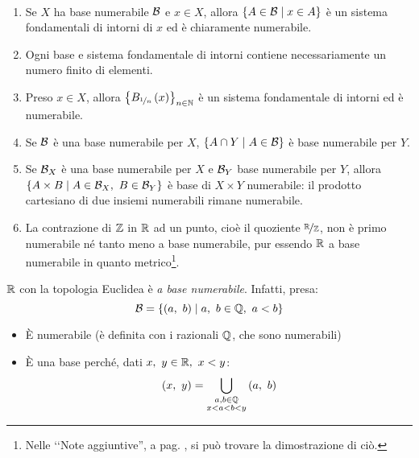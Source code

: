 \begin{demonstration}~{}
\begin{enumerate}[label=\Roman*]
	\item Se $X$ ha base numerabile $\mathcal{B}$ e $x\in X$, allora $\left\{A\in \mathcal{B}\mid x\in A\right\}$ è un sistema fondamentali di intorni di $x$ ed è chiaramente numerabile.
	\item Ogni base e sistema fondamentale di intorni contiene necessariamente un numero finito di elementi.
	\item Preso $x\in X$, allora $\left\{B_{\nicefrac{1}{n}}\left(x\right)\right\}_{n\in\mathbb{N}}$ è un sistema fondamentale di intorni ed è numerabile.
	\item Se $\mathcal{B}$ è una base numerabile per $X$, $\left\{A\cap Y\mid A\in \mathcal{B}\right\}$ è base numerabile per $Y$.
	\item Se $\mathcal{B}_X$ è una base numerabile per $X$ e $\mathcal{B}_Y$ base numerabile per $Y$, allora $\left\{A\times B\mid A\in \basis_X,\ B\in\basis_Y\right\}$ è base di $X\times Y$ numerabile: il prodotto cartesiano di due insiemi numerabili rimane numerabile.
	\item La contrazione di $\mathbb{Z}$ in $\mathbb{R}$ ad un punto, cioè il quoziente $\nicefrac{\mathbb{R}}{\mathbb{Z}}$, non è primo numerabile né tanto meno a base numerabile, pur essendo $\mathbb{R}$ a base numerabile in quanto metrico\footnote{Nelle ‘‘Note aggiuntive'', a pag. \pageref{dimostrazionenonnumerabilità}, si può trovare la dimostrazione di ciò.}.
\end{enumerate}
\vspace{-3mm}
\end{demonstration}
\begin{example}
	$\mathbb{R}$ con la topologia Euclidea è \textit{a base numerabile}. Infatti, presa:
	\begin{equation*}
		\mathcal{B}=\left\{\left(a,\ b\right)\mid a,\ b\in \mathbb{Q},\ a<b\right\}
	\end{equation*}
	\begin{itemize}
		\item È numerabile (è definita con i razionali $\mathbb{Q}$, che sono numerabili)
		\item È una base perché, dati $x,\ y\in\realset,\ x<y$:
		\begin{equation*}
			\left(x,\ y\right)=\bigcup_{\substack{a, b\in\rationalset\\x<a<b<y}}\left(a,\ b\right)
		\end{equation*}
	\end{itemize}
\vspace{-6mm}
\end{example}
